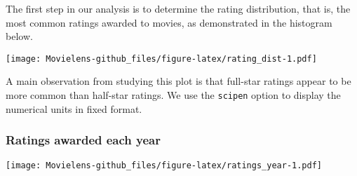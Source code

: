\documentclass[]{article}
\newenvironment{Shaded}{\begin{snugshade}}{\end{snugshade}}
\newcommand{\DataTypeTok}[1]{\textcolor[rgb]{0.13,0.29,0.53}{#1}}
\newcommand{\DecValTok}[1]{\textcolor[rgb]{0.00,0.00,0.81}{#1}}
\newcommand{\KeywordTok}[1]{\textcolor[rgb]{0.13,0.29,0.53}{\textbf{#1}}}
\newcommand{\NormalTok}[1]{#1}
\newcommand{\OperatorTok}[1]{\textcolor[rgb]{0.81,0.36,0.00}{\textbf{#1}}}
\newcommand{\StringTok}[1]{\textcolor[rgb]{0.31,0.60,0.02}{#1}}
\begin{document}
The first step in our analysis is to determine the rating distribution,
that is, the most common ratings awarded to movies, as demonstrated in
the histogram below.

\begin{Shaded}
\end{Shaded}

\texttt{[image: Movielens-github\_files/figure-latex/rating\_dist-1.pdf]}

A main observation from studying this plot is that full-star ratings
appear to be more common than half-star ratings. We use the
\texttt{scipen} option to display the numerical units in fixed format.

\hypertarget{ratings-awarded-each-year}{%
\subsubsection{Ratings awarded each
year}\label{ratings-awarded-each-year}}

\begin{Shaded}
\end{Shaded}

\texttt{[image: Movielens-github\_files/figure-latex/ratings\_year-1.pdf]}
\end{document}
